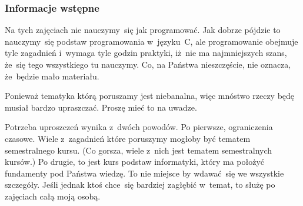 \documentclass[10pt,t]{beamer}
\begin{document}
\begin{frame}
  \frametitle{Informacje wstępne}


  Na tych zajęciach \alert{nie} nauczymy~się jak programować. Jak dobrze
  pójdzie to nauczymy~się podstaw programowania w~języku~C, ale
  programowanie obejmuje tyle zagadnień i~wymaga tyle godzin praktyki,
  iż~nie ma najmniejszych szans, że~się tego wszystkiego tu nauczymy.
  Co, na Państwa nieszczęście, nie oznacza, że~będzie mało materiału.

  Ponieważ tematyka którą poruszamy jest niebanalna, więc mnóstwo rzeczy
  będę musiał bardzo \alert{upraszczać}. Proszę mieć to na uwadze.

  Potrzeba uproszczeń wynika z~dwóch powodów. Po pierwsze, ograniczenia
  czasowe. Wiele z~zagadnień które poruszymy mogłoby być tematem
  semestralnego kursu. (Co gorsza, wiele z~nich \alert{jest} tematem
  semestralnych kursów.) Po drugie, to jest kurs \alert{podstaw}
  informatyki, który ma położyć fundamenty pod Państwa wiedzę. To nie
  miejsce by wdawać~się we wszystkie szczegóły. Jeśli jednak ktoś chce~się
  bardziej zagłębić w~temat, to służę po zajęciach całą moją osobą.


\end{frame}
\end{document}
